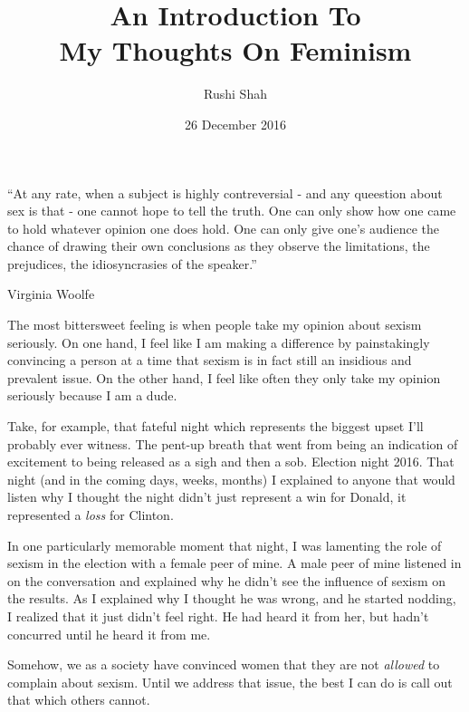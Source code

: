 \documentclass{article}
\author{Rushi Shah}
\date{26 December 2016}
\title{An Introduction To \\ My Thoughts On Feminism}
\begin{document}
\maketitle

	\epigraph{``At any rate, when a subject is highly contreversial - and any queestion about sex is that - one cannot hope to tell the truth. One can only show how one came to hold whatever opinion one does hold. One can only give one's audience the chance of drawing their own conclusions as they observe the limitations, the prejudices, the idiosyncrasies of the speaker.''}{Virginia Woolfe}

	The most bittersweet feeling is when people take my opinion about sexism seriously. On one hand, I feel like I am making a difference by painstakingly convincing a person at a time that sexism is in fact still an insidious and prevalent issue. On the other hand, I feel like often they only take my opinion seriously because I am a dude. 

	Take, for example, that fateful night which represents the biggest upset I'll probably ever witness. The pent-up breath that went from being an indication of excitement to being released as a sigh and then a sob. Election night 2016. That night (and in the coming days, weeks, months) I explained to anyone that would listen why I thought the night didn't just represent a win for Donald, it represented a \textit{loss} for Clinton. 

	In one particularly memorable moment that night, I was lamenting the role of sexism in the election with a female peer of mine. A male peer of mine listened in on the conversation and explained why he didn't see the influence of sexism on the results. As I explained why I thought he was wrong, and he started nodding, I realized that it just didn't feel right. He had heard it from her, but hadn't concurred until he heard it from me. 

	Somehow, we as a society have convinced women that they are not \textit{allowed} to complain about sexism. Until we address that issue, the best I can do is call out that which others cannot. 



\end{document}
